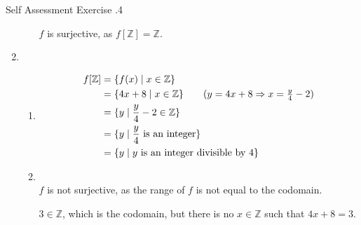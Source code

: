 \documentclass[\main/notes.tex]{subfiles}
\begin{document}
\begin{exercise}{Self Assessment Exercise \thechapter.4}
\begin{enumerate}
\begin{enumerate}[label=(\alph*)]
								$f$ is surjective, as $f[\mathbb{Z}] = \mathbb{Z}$.
						\end{enumerate}
					\pagebreak
					\item {}
						\begin{enumerate}[label=(\alph*)]
							\item {}
								\begin{align*}
									f[\mathbb{Z}] &= \{f(x) \mid x \in \mathbb{Z}\}\\
									&= \{4x + 8 \mid x \in \mathbb{Z}\} \tag*{$(y = 4x + 8 \Rightarrow x = \frac{y}{4} - 2)$}\\
									&= \{y \mid \frac{y}{4} - 2 \in \mathbb{Z}\}\\
									&= \{y \mid \frac{y}{4} \text{ is an integer}\}\\
									&= \{y \mid y \text{ is an integer divisible by 4}\}
								\end{align*}
								\item {}\\
									$f$ is not surjective, as the range of $f$ is not equal to the codomain.
									\begin{subproof}[Counterexample]
										$3 \in \mathbb{Z}$, which is the codomain, but there is no $x \in \mathbb{Z}$ such that $4x + 8 = 3$.
									\end{subproof}
						\end{enumerate}
				\end{enumerate}
			\end{exercise}
		\pagebreak
\end{document}
